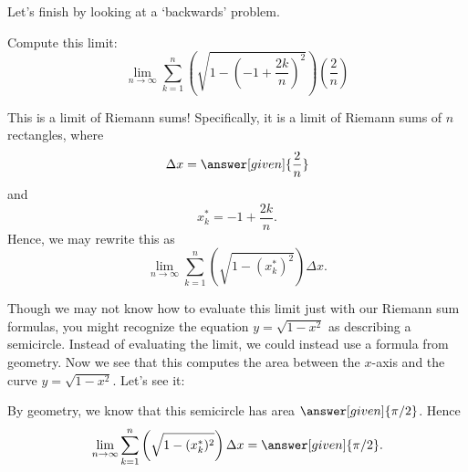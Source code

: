 \documentclass{ximera}
\begin{document}
Let's finish by looking at a `backwards' problem.

\begin{example}
  Compute this limit:
  \[
  \lim_{n\to \infty} \sum_{k=1}^n \left(\sqrt{1-\left(-1+\frac{2k}{n}\right)^2}\right)
  \left(\frac{2}{n}\right)
  \]
  \begin{explanation}
    This is a limit of Riemann sums!  Specifically, it is a limit of
    Riemann sums of $n$ rectangles, where
    \[
    \Delta x = \answer[given]{\frac{2}{n}}
    \]
    and
    \[
    x_k^* = -1+\frac{2k}{n}.
    \]
    Hence, we may rewrite this as
    \[
    \lim_{n\to \infty} \sum_{k=1}^n \left(\sqrt{1-(x_k^*)^2}\right)
    \Delta x.
    \]

    Though we may not know how to evaluate this limit just with our Riemann sum formulas, you might recognize the equation $y=\sqrt{1-x^2}$ as describing a semicircle. Instead of evaluating the limit, we could instead use a formula from geometry.
    Now we see that this computes the area between the $x$-axis and
    the curve $y = \sqrt{1-x^2}$. Let's see it:
    \begin{image}
    \end{image}
    By geometry, we know that this semicircle has area $\answer[given]{\pi/2}$. Hence
    \[
    \lim_{n\to \infty} \sum_{k=1}^n \left(\sqrt{1-(x_k^*)^2}\right)\Delta x =\answer[given]{\pi/2}.
    \]
  \end{explanation}
\end{example}





\end{document}
